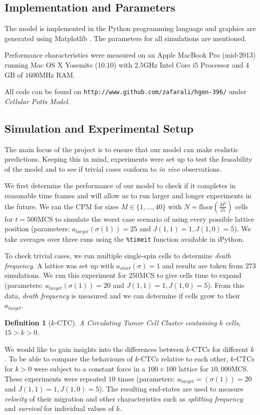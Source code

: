 \documentclass[12pt]{article}
\newtheorem{definition}{Definition}
\def\code#1{\texttt{#1}}
\begin{document}
\subsection{Implementation and Parameters}
The model is implemented in the Python programming language and graphics are generated using Matplotlib \cite{matplotlib}. The parameters for all simulations are mentioned.

Performance characteristics were measured on an Apple MacBook Pro (mid-2013) running Mac OS X Yosemite ($10.10$) with $2.5$GHz Intel Core i$5$ Processor and $4$GB of $1600$MHz RAM.

All code can be found on \code{http://www.github.com/zafarali/hgen-396/} under \emph{Cellular Potts Model}.

\subsection{Simulation and Experimental Setup}
The main focus of the project is to ensure that our model can make realistic predictions. Keeping this in mind, experiments were set up to test the feasability of the model and to see if trivial cases conform to \emph{in vivo} observations. 

We first determine the performance of our model to check if it completes in reasonable time frames and will allow us to run larger and longer experiments in the future. We ran the CPM for sizes $M\in\{1, \ldots , 40\}$ with $N=\text{floor}(\frac{M^2}{25})$ cells for $t=500$MCS to simulate the worst case scenario of using every possible lattice position (parameters: $a_{target}(\sigma(1))=25$ and $J(1,1)=1, J(1,0)=5$). We take averages over three runs using the \code{\%timeit} function available in iPython.

To check trivial cases, we run multiple single-spin cells to determine \emph{death frequency}. A lattice was set up with $a_{start}(\sigma)=1$ and results are taken from $273$ simulations. We run this experiment for $250$MCS to give cells time to expand (parameters: $a_{target}(\sigma(1))=20$ and $J(1,1)=1, J(1,0)=5$). From this data, \emph{death frequency} is measured and we can determine if cells grow to their $a_{target}$.

\begin{definition}[$k$-CTC]
A Circulating Tumor Cell Cluster containing $k$ cells, $15>k>0$.
\end{definition}

We would like to gain insights into the differences between $k$-CTCs for different $k$. To be able to compare the behaviours of $k$-CTCs relative to each other, $k$-CTCs for $k>0$ were subject to a constant force in a $100\times100$ lattice for $10,000$MCS. These experiments were repeated $10$ times (parameters: $a_{target}=(\sigma(1))=20$ and $J(1,1)=1, J(1,0)=5$). The resulting end-states are used to measure \emph{velocity} of their migration and other characteristics such as \emph{splitting frequency} and \emph{survival} for individual values of $k$.
\end{document}
